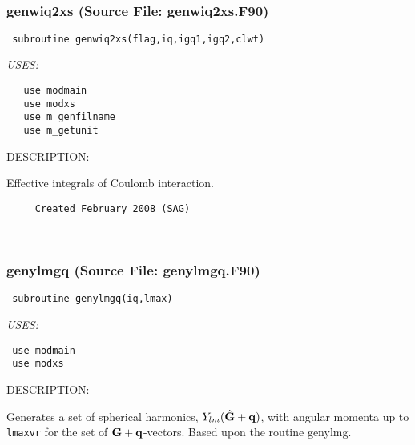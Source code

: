 \documentclass[11pt]{article}
\begin{document}



 
 
\mbox{}\hrulefill\ 
 
\subsubsection{genwiq2xs (Source File: genwiq2xs.F90)}


\begin{verbatim} subroutine genwiq2xs(flag,iq,igq1,igq2,clwt)\end{verbatim}{\em USES:}
\begin{verbatim}   use modmain
   use modxs
   use m_genfilname
   use m_getunit\end{verbatim}
{\sf DESCRIPTION:\\ }


     Effective integrals of Coulomb interaction.
  
\begin{verbatim}     Created February 2008 (SAG)\end{verbatim}


 
 
\mbox{}\hrulefill\ 
 
\subsubsection{genylmgq (Source File: genylmgq.F90)}


\begin{verbatim} subroutine genylmgq(iq,lmax)\end{verbatim}{\em USES:}
\begin{verbatim} use modmain
 use modxs\end{verbatim}
{\sf DESCRIPTION:\\ }


     Generates a set of spherical harmonics, $Y_{lm}(\hat{\bf G}+{\bf q})$,
     with angular
     momenta up to {\tt lmaxvr} for the set of ${\bf G+q}$-vectors. Based upon
     the routine genylmg.
  
\end{document}
